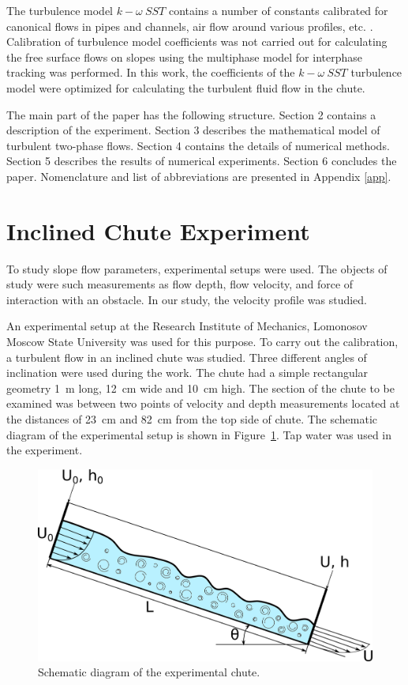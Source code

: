 \documentclass[mathematics,article,submit,pdftex,moreauthors]{Definitions/mdpi}
\begin{document}
The turbulence model $k-\omega\ SST$ contains a number of constants calibrated for canonical flows in pipes and channels, air flow around various profiles, etc. \cite{LaunderSpalding1974, Tahry1983, LaunderMorseRodiSpaldiug1972}. Calibration of turbulence model coefficients was not carried out for calculating the free surface flows on slopes using the multiphase model for interphase tracking was performed. In this work, the coefficients of the $k-\omega\ SST$ turbulence model were optimized for calculating the turbulent fluid flow in the chute.

The main part of the paper has the following structure. 
Section 2 contains a description of the experiment. Section 3 describes the mathematical model of turbulent two-phase flows. Section 4 contains the details of numerical methods. 
Section 5 describes the results of numerical experiments. 
Section 6 concludes the paper. Nomenclature and list of abbreviations are presented in Appendix \ref{app}.


\section{Inclined Chute Experiment }

To study slope flow parameters, experimental setups were used. The objects of study were such measurements as flow depth, flow velocity, and force of interaction with an obstacle. In our study, the velocity profile was studied.

An experimental setup at the Research Institute of Mechanics, Lomonosov Moscow State University \cite{fluids7030111} was used for this purpose. To carry out the calibration, a turbulent flow in an inclined chute was studied. Three different angles of inclination were used during the work. The chute had a simple rectangular geometry 1~m long, 12~cm wide and 10~cm high. The section of the chute to be examined was between two points of velocity and depth measurements located at the distances of 23~cm and 82~cm from the top side of chute. The schematic diagram of the experimental setup is shown in Figure~\ref{NIIMexLinearUProfileInlet}. Tap water was used in the experiment.

\begin{figure}[H]
\begin{center}
\includegraphics[width=10.5 cm]{NIIMexLinearUProfileInlet.png}
\caption{Schematic diagram of the experimental chute.\label{NIIMexLinearUProfileInlet}}
\end{center}
\end{figure}   
\unskip
\end{document}
